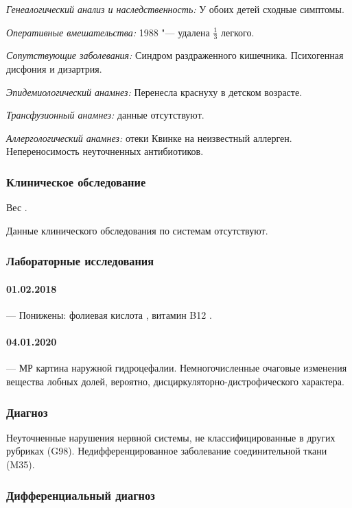 \documentclass[a4paper,14pt]{extarticle}
\newcommand{\kilogramm}{кг}
\newcommand{\pgpml}{пг/мл}
\newcommand{\ngpml}{пг/мл}
\begin{document}
\emph{Генеалогический анализ и наследственность:} У обоих детей сходные симптомы.

\emph{Оперативные вмешательства:} 1988 "--- удалена $\frac{1}{3}$ легкого.

\emph{Сопутствующие заболевания:} Синдром раздраженного кишечника. Психогенная дисфония и дизартрия.

\emph{Эпидемиологический анамнез:} Перенесла краснуху в детском возрасте.

\emph{Трансфузионный анамнез:} данные отсутствуют.

\emph{Аллергологический анамнез:} отеки Квинке на неизвестный аллерген. Непереносимость неуточненных антибиотиков.

\subsubsection*{Клиническое обследование}

Вес \numprint[\kilogramm]{70}.

Данные клинического обследования по системам отсутствуют.

\subsubsection*{Лабораторные исследования}

\paragraph{01.02.2018} --- Понижены: фолиевая кислота \numprint[\ngpml]{1.5}, витамин B12 \numprint[\pgpml]{139}.

\paragraph{04.01.2020} --- МР картина наружной гидроцефалии. Немногочисленные очаговые изменения вещества лобных долей, вероятно, дисциркуляторно-дистрофического характера.

\subsubsection*{Диагноз}

Неуточненные нарушения нервной системы, не классифицированные в других рубриках (G98). Недифференцированное заболевание соединительной ткани (M35).

\subsubsection*{Дифференциальный диагноз}
\end{document}
